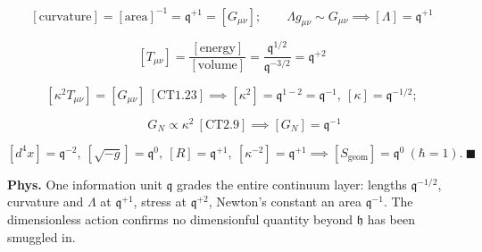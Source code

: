 \begin{theorem}
\[
[\text{curvature}]=[\text{area}]^{-1}=\mathfrak q^{+1}=[G_{\mu\nu}];\qquad\Lambda g_{\mu\nu}\sim G_{\mu\nu}\implies[\Lambda]=\mathfrak q^{+1}
\]

\[
[T_{\mu\nu}]=\frac{[\text{energy}]}{[\text{volume}]}=\frac{\mathfrak q^{1/2}}{\mathfrak q^{-3/2}}=\mathfrak q^{+2}
\]

\[
[\kappa^2T_{\mu\nu}]=[G_{\mu\nu}]\ [\mathrm{CT1.23}]\implies[\kappa^2]=\mathfrak q^{1-2}=\mathfrak q^{-1},\ [\kappa]=\mathfrak q^{-1/2};
\]

\[
\qquad G_N\propto\kappa^2\ [\mathrm{CT2.9}]\implies[G_N]=\mathfrak q^{-1}
\]

\[
[d^4x]=\mathfrak q^{-2},\ [\sqrt{-g}]=\mathfrak q^0,\ [R]=\mathfrak q^{+1},\ [\kappa^{-2}]=\mathfrak q^{+1}\implies[S_{\mathrm{geom}}]=\mathfrak q^0\ (\hbar=1).\ \blacksquare
\]

\textbf{Phys.} One information unit $\mathfrak q$ grades the entire continuum layer: lengths $\mathfrak q^{-1/2}$, curvature and $\Lambda$ at $\mathfrak q^{+1}$, stress at $\mathfrak q^{+2}$, Newton’s constant an area $\mathfrak q^{-1}$. The dimensionless action confirms no dimensionful quantity beyond $\mathfrak h$ has been smuggled in.

\end{theorem}


